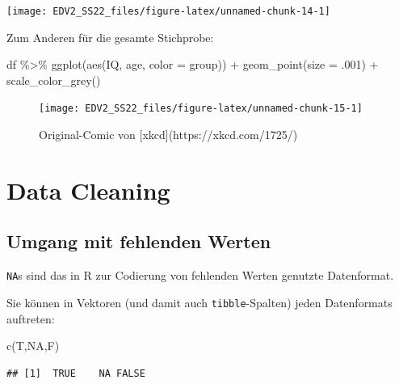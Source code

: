 \documentclass[
]{book}
\newenvironment{Shaded}{\begin{snugshade}}{\end{snugshade}}
\newcommand{\AttributeTok}[1]{\textcolor[rgb]{0.77,0.63,0.00}{#1}}
\newcommand{\ConstantTok}[1]{\textcolor[rgb]{0.00,0.00,0.00}{#1}}
\newcommand{\DecValTok}[1]{\textcolor[rgb]{0.00,0.00,0.81}{#1}}
\newcommand{\FunctionTok}[1]{\textcolor[rgb]{0.00,0.00,0.00}{#1}}
\newcommand{\NormalTok}[1]{#1}
\newcommand{\SpecialCharTok}[1]{\textcolor[rgb]{0.00,0.00,0.00}{#1}}
\begin{document}
\begin{center}\texttt{[image: EDV2\_SS22\_files/figure-latex/unnamed-chunk-14-1]} \end{center}

Zum Anderen für die gesamte Stichprobe:

\begin{Shaded}
\begin{Highlighting}[]
\NormalTok{df }\SpecialCharTok{\%\textgreater{}\%} 
  \FunctionTok{ggplot}\NormalTok{(}\FunctionTok{aes}\NormalTok{(IQ, age, }\AttributeTok{color =}\NormalTok{ group)) }\SpecialCharTok{+}
  \FunctionTok{geom\_point}\NormalTok{(}\AttributeTok{size =}\NormalTok{ .}\DecValTok{001}\NormalTok{) }\SpecialCharTok{+}
  \FunctionTok{scale\_color\_grey}\NormalTok{()}
\end{Highlighting}
\end{Shaded}

\begin{figure}

{\centering \texttt{[image: EDV2\_SS22\_files/figure-latex/unnamed-chunk-15-1]} 

}

\caption{Original-Comic von [xkcd](https://xkcd.com/1725/)}\label{fig:unnamed-chunk-15}
\end{figure}

\hypertarget{data-cleaning}{%
\section{Data Cleaning}\label{data-cleaning}}

\hypertarget{umgang-mit-fehlenden-werten}{%
\subsection{Umgang mit fehlenden Werten}\label{umgang-mit-fehlenden-werten}}

\texttt{NA}s sind das in R zur Codierung von fehlenden Werten genutzte Datenformat.

Sie können in Vektoren (und damit auch \texttt{tibble}-Spalten) jeden Datenformats auftreten:

\begin{Shaded}
\begin{Highlighting}[]
\FunctionTok{c}\NormalTok{(T,}\ConstantTok{NA}\NormalTok{,F)}
\end{Highlighting}
\end{Shaded}

\begin{verbatim}
## [1]  TRUE    NA FALSE
\end{verbatim}
\end{document}

